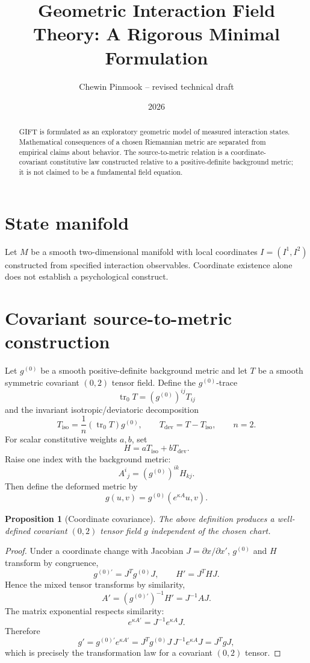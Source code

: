 \documentclass[11pt]{article}
\title{Geometric Interaction Field Theory: A Rigorous Minimal Formulation}
\author{Chewin Pinmook -- revised technical draft}
\date{2026}
\newtheorem{proposition}{Proposition}
\begin{document}
\maketitle
\begin{abstract}
GIFT is formulated as an exploratory geometric model of measured interaction states. Mathematical consequences of a chosen Riemannian metric are separated from empirical claims about behavior. The source-to-metric relation is a coordinate-covariant constitutive law constructed relative to a positive-definite background metric; it is not claimed to be a fundamental field equation.
\end{abstract}

\section{State manifold}
Let $M$ be a smooth two-dimensional manifold with local coordinates $I=(I^1,I^2)$ constructed from specified interaction observables. Coordinate existence alone does not establish a psychological construct.

\section{Covariant source-to-metric construction}
Let $g^{(0)}$ be a smooth positive-definite background metric and let $T$ be a smooth symmetric covariant $(0,2)$ tensor field. Define the $g^{(0)}$-trace
\[
\operatorname{tr}_{0}T=(g^{(0)})^{ij}T_{ij}
\]
and the invariant isotropic/deviatoric decomposition
\[
T_{\mathrm{iso}}=\frac{1}{n}(\operatorname{tr}_{0}T)g^{(0)},\qquad
T_{\mathrm{dev}}=T-T_{\mathrm{iso}},\qquad n=2.
\]
For scalar constitutive weights $a,b$, set
\[
H=aT_{\mathrm{iso}}+bT_{\mathrm{dev}}.
\]
Raise one index with the background metric:
\[
A^i{}_j=(g^{(0)})^{ik}H_{kj}.
\]
Then define the deformed metric by
\[
\boxed{
g(u,v)=g^{(0)}\!\left(e^{\kappa A}u,v\right).
}
\]

\begin{proposition}[Coordinate covariance]
The above definition produces a well-defined covariant $(0,2)$ tensor field $g$ independent of the chosen chart.
\end{proposition}
\begin{proof}
Under a coordinate change with Jacobian $J=\partial x/\partial x'$, $g^{(0)}$ and $H$ transform by congruence,
\[
g^{(0)\prime}=J^T g^{(0)}J,\qquad H'=J^THJ.
\]
Hence the mixed tensor transforms by similarity,
\[
A'=(g^{(0)\prime})^{-1}H'=J^{-1}AJ.
\]
The matrix exponential respects similarity:
\[
e^{\kappa A'}=J^{-1}e^{\kappa A}J.
\]
Therefore
\[
g'=g^{(0)\prime}e^{\kappa A'}
=J^T g^{(0)}J\,J^{-1}e^{\kappa A}J
=J^T gJ,
\]
which is precisely the transformation law for a covariant $(0,2)$ tensor.
\end{proof}
\end{document}
